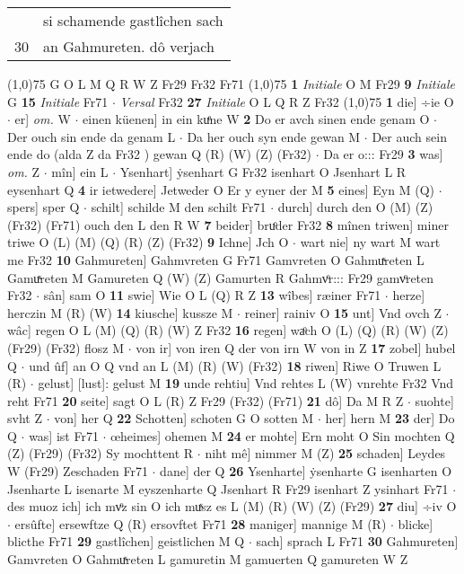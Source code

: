 \documentclass[8pt,a4paper,notitlepage]{article}
\begin{document}
\begin{table}[ht]
\begin{minipage}[t]{0.5\linewidth}
\begin{tabular}{rl}
 & si schamende gastlîchen sach\\ 
30 & an Gahmureten. dô verjach\\ 
\end{tabular}
\scriptsize
\line(1,0){75} \newline
G O L M Q R W Z Fr29 Fr32 Fr71 \newline
\line(1,0){75} \newline
\textbf{1} \textit{Initiale} O M Fr29  \textbf{9} \textit{Initiale} G  \textbf{15} \textit{Initiale} Fr71   $\cdot$ \textit{Versal} Fr32  \textbf{27} \textit{Initiale} O L Q R Z Fr32  \newline
\line(1,0){75} \newline
\textbf{1} die] ÷ie O  $\cdot$ er] \textit{om.} W  $\cdot$ einen küenen] in ein kuͤne W \textbf{2} Do er avch sinen ende genam O  $\cdot$ Der ouch sin ende da genam L  $\cdot$ Da her ouch syn ende gewan M  $\cdot$ Der auch sein ende do (alda Z da Fr32 ) gewan Q (R) (W) (Z) (Fr32)  $\cdot$ Da er o::: Fr29 \textbf{3} was] \textit{om.} Z  $\cdot$ mîn] ein L  $\cdot$ Ysenhart] ẏsenhart G Fr32 isenhart O Jsenhart L R eysenhart Q \textbf{4} ir ietwedere] Jetweder O Er y eyner der M \textbf{5} eines] Eyn M (Q)  $\cdot$ spers] sper Q  $\cdot$ schilt] schilde M den schilt Fr71  $\cdot$ durch] durch den O (M) (Z) (Fr32) (Fr71) ouch den L den R W \textbf{7} beider] bruͦder Fr32 \textbf{8} mînen triwen] miner triwe O (L) (M) (Q) (R) (Z) (Fr32) \textbf{9} Ichne] Jch O  $\cdot$ wart nie] ny wart M wart me Fr32 \textbf{10} Gahmureten] Gahmvreten G Fr71 Gamvreten O Gahmuͯreten L Gamuͯreten M Gamureten Q (W) (Z) Gamurten R Gahmvͦr::: Fr29 gamvͦreten Fr32  $\cdot$ sân] sam O \textbf{11} swie] Wie O L (Q) R Z \textbf{13} wîbes] ræiner Fr71  $\cdot$ herze] herczin M (R) (W) \textbf{14} kiusche] kussze M  $\cdot$ reiner] rainiv O \textbf{15} unt] Vnd ovch Z  $\cdot$ wâc] regen O L (M) (Q) (R) (W) Z Fr32 \textbf{16} regen] waͦch O (L) (Q) (R) (W) (Z) (Fr29) (Fr32) flosz M  $\cdot$ von ir] von iren Q der von irn W von in Z \textbf{17} zobel] hubel Q  $\cdot$ und ûf] an O Q vnd an L (M) (R) (W) (Fr32) \textbf{18} riwen] Riwe O Truwen L (R)  $\cdot$ gelust] [lust]: gelust M \textbf{19} unde rehtiu] Vnd rehtes L (W) vnrehte Fr32 Vnd reht Fr71 \textbf{20} seite] sagt O L (R) Z Fr29 (Fr32) (Fr71) \textbf{21} dô] Da M R Z  $\cdot$ suohte] svht Z  $\cdot$ von] her Q \textbf{22} Schotten] schoten G O sotten M  $\cdot$ her] hern M \textbf{23} der] Do Q  $\cdot$ was] ist Fr71  $\cdot$ œheimes] ohemen M \textbf{24} er mohte] Ern moht O Sin mochten Q (Z) (Fr29) (Fr32) Sy mochttent R  $\cdot$ niht mê] nimmer M (Z) \textbf{25} schaden] Leydes W (Fr29) Zeschaden Fr71  $\cdot$ dane] der Q \textbf{26} Ysenharte] ẏsenharte G isenharten O Jsenharte L isenarte M eyszenharte Q Jsenhart R Fr29 isenhart Z ysinhart Fr71  $\cdot$ des muoz ich] ich mvͦz sin O ich muͯsz es L (M) (R) (W) (Z) (Fr29) \textbf{27} diu] ÷iv O  $\cdot$ ersûfte] ersewftze Q (R) ersovftet Fr71 \textbf{28} maniger] mannige M (R)  $\cdot$ blicke] blicthe Fr71 \textbf{29} gastlîchen] geistlichen M Q  $\cdot$ sach] sprach L Fr71 \textbf{30} Gahmureten] Gamvreten O Gahmuͯreten L gamuretin M gamuerten Q gamureten W Z 
\end{minipage}
\end{table}
\end{document}
